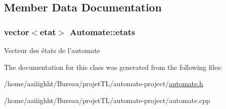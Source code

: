 \subsection{Member Data Documentation}
\hypertarget{class_automate_a8dd5a4e024b8e84834198ac132c3896b}{
\subsubsection[{etats}]{\setlength{\rightskip}{0pt plus 5cm}vector$<${\bf etat}$>$ Automate\-::etats}}\label{class_automate_a8dd5a4e024b8e84834198ac132c3896b}
Vecteur des états de l'automate 

The documentation for this class was generated from the following files\-:\begin{DoxyCompactItemize}
\item 
/home/aaiiighht/\-Bureau/projet\-T\-L/automate-\/project/\hyperlink{automate_8h}{automate.\-h}\item 
/home/aaiiighht/\-Bureau/projet\-T\-L/automate-\/project/automate.\-cpp\end{DoxyCompactItemize}
